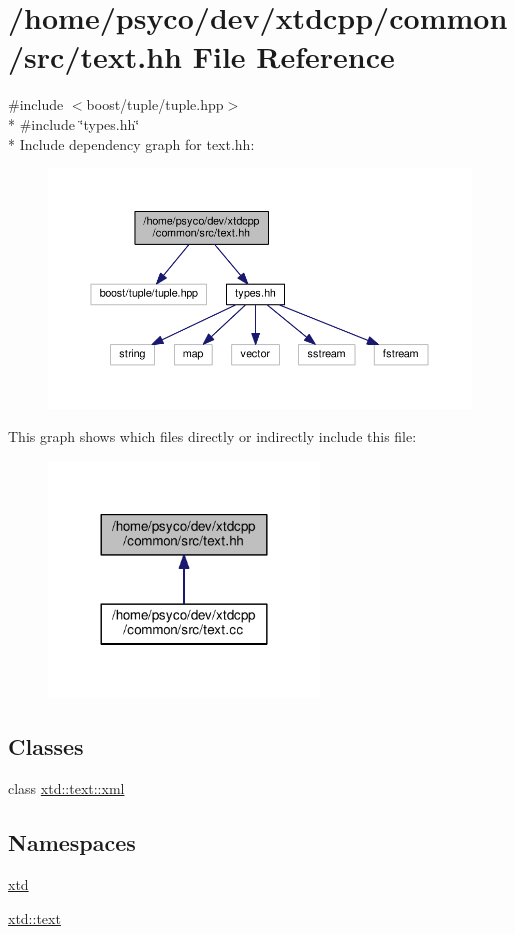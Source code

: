 \hypertarget{text_8hh}{}\section{/home/psyco/dev/xtdcpp/common/src/text.hh File Reference}
\label{text_8hh}
{\ttfamily \#include $<$boost/tuple/tuple.\+hpp$>$}\\*
{\ttfamily \#include \char`\"{}types.\+hh\char`\"{}}\\*
Include dependency graph for text.\+hh\+:
\nopagebreak
\begin{figure}[H]
\begin{center}
\leavevmode
\includegraphics[width=350pt]{text_8hh__incl}
\end{center}
\end{figure}
This graph shows which files directly or indirectly include this file\+:
\nopagebreak
\begin{figure}[H]
\begin{center}
\leavevmode
\includegraphics[width=204pt]{text_8hh__dep__incl}
\end{center}
\end{figure}
\subsection*{Classes}
\begin{DoxyCompactItemize}
\item 
class \hyperlink{classxtd_1_1text_1_1xml}{xtd\+::text\+::xml}
\end{DoxyCompactItemize}
\subsection*{Namespaces}
\begin{DoxyCompactItemize}
\item 
 \hyperlink{namespacextd}{xtd}
\item 
 \hyperlink{namespacextd_1_1text}{xtd\+::text}
\end{DoxyCompactItemize}
